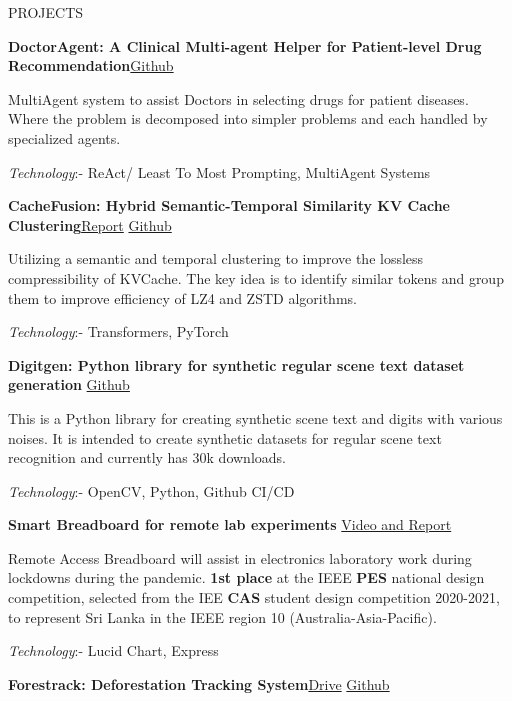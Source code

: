 \documentclass{resume} %
\begin{document}
\begin{rSection}{PROJECTS}
\vspace{-1.25em}
\item \textbf{DoctorAgent: A Clinical Multi-agent Helper for Patient-level Drug
Recommendation}\hfill \href{https://github.com/DevinDeSilva/DoctorAssist}{Github}

MultiAgent system to assist Doctors in selecting drugs for patient diseases. Where the problem is decomposed into simpler problems and each handled by specialized agents.

\textit{Technology}:- ReAct/ Least To Most Prompting, MultiAgent Systems 

\item \textbf{CacheFusion: Hybrid Semantic-Temporal Similarity
KV Cache Clustering}\hfill \href{https://rpiexchange-my.sharepoint.com/:b:/g/personal/desild_rpi_edu/ESXEKPhdWvtHsWfQy-i_tjcBM3565gBZCgLQKYc3wChb5Q?e=f4u2hR}{Report}
\hspace{2mm}
\href{https://github.com/CDFire/CacheFusion}{Github}

Utilizing a semantic and temporal clustering to improve the lossless compressibility of KVCache. The key idea is to identify similar tokens and group them to improve efficiency of LZ4 and ZSTD algorithms.

\textit{Technology}:- Transformers, PyTorch

\item \textbf{Digitgen: Python library for synthetic regular scene text dataset generation }\hfill \href{https://github.com/ACRA-FL/digitgen}{Github}

This is a Python library for creating synthetic scene text and digits with various noises. It is intended to create synthetic datasets for regular scene text recognition and currently has 30k downloads.

\textit{Technology}:- OpenCV, Python, Github CI/CD
\item \textbf{Smart Breadboard for remote lab experiments }\hfill \href{https://drive.google.com/drive/u/0/folders/1xaSNThewvvsGVQ5pdaWTqzAHVvRtRN91}{Video and Report}

Remote Access Breadboard will assist in electronics laboratory work during lockdowns during the pandemic. {\bf 1st place} at the IEEE {\bf PES} national design competition, selected from the IEE {\bf CAS} student design competition 2020-2021, to represent Sri Lanka in the IEEE region 10 (Australia-Asia-Pacific).

\textit{Technology}:- Lucid Chart, Express 
\item \textbf{Forestrack: Deforestation Tracking System}\hfill \href{https://drive.google.com/drive/folders/1QNPDZ0rpAtmN9D_4cJCMls4uN9GD2Hs8?usp=sharing}{Drive}
\hspace{2mm}
\href{https://github.com/Deforestration-Tracker-ADK/forestrack-core}{Github}


\end{rSection}
\end{document}
